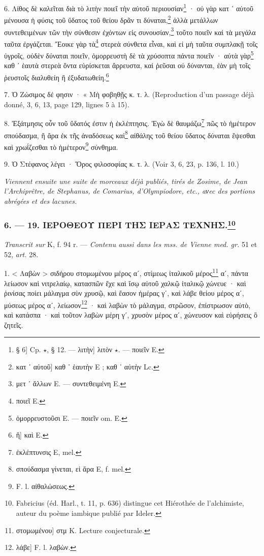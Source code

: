 \documentclass[a4paper, 11pt, oneside, polutonikogreek, french]{article}
\begin{document}
6. Λίθος δὲ καλεῖται διὰ τὸ λιτὴν ποιεῖ τὴν αὐτοῦ περιουσίαν\footnote{§ 6] Cp. $\star$, § 12. --- λιτὴν] λιτὸν $\star$. --- ποιεῖν E.} · οὐ γὰρ κατ ᾽ αὐτοῦ μένουσα ἡ φύσις τοῦ ὕδατος τοῦ θείου δρᾶν τι δύναται,\footnote{κατ ᾽ αὐτοῦ] καθ ᾽ ἑαυτὴν E ; καθ ᾽ αὑτὴν Lc.} ἀλλὰ μετάλλων συντεθειμένων τῶν τὴν σύνθεσιν ἐχόντων εἰς συνουσίαν,\footnote{μετ ᾽ ἄλλων E. --- συντεθειμένη E.} τοῦτο ποιεῖν καὶ τὰ μεγάλα ταῦτα ἐργάζεται. Ἔοικε γὰρ τὰ\footnote{ποιεῖ E.} στερεὰ σύνθετα εἶναι, καὶ εἰ μὴ ταῦτα συμπλακῇ τοῖς ὑγροῖς, οὐδὲν δύναται ποιεῖν, ὁμορρευστὴ δὲ τὰ χρύσοπτα πάντα ποιεῖν · αὐτὰ γὰρ\footnote{ὁμορρευστοῦσι E. --- ποιεῖν om. E.} καθ ᾽ ἑαυτὰ στερεὰ ὄντα εὑρίσκεται ἄρρευστα, καὶ ῥεῦσαι οὐ δύνανται, ἐὰν μὴ τοῖς ῥευστοῖς διαλυθείη ἢ ἐξυδατωθείη.\footnote{ἢ] καὶ E.}

7. Ὁ Ζώσιμος δέ φησιν · « Μὴ φοβηθῇς κ. τ. λ. (Reproduction d'un passage déjà donné, 3, 6, 13, page 129, lignes 5 à 15).

8. Ἐξάτμησις οὖν τοῦ ὕδατός ἐστιν ἡ ἐκλέπτησις. Ἐγὼ δὲ θαυμάζω\footnote{ἐκλέπτυνσις E, mel.} πῶς τὸ ἡμέτερον σπούδασμα, ἢ ἄρα ἐκ τῆς ἀναδόσεως καὶ\footnote{σπούδασμα γίνεται, εἰ ἄρα E, f. mel.} αἰθάλης τοῦ θείου ὕδατος δύναται ἕψεσθαι καὶ χρωΐζεσθαι τὸ ἡμέτερον\footnote{F. l. αἰθαλώσεως.} σύνθημα.

9. Ὁ Στέφανος λέγει · Ὅρος φιλοσοφίας κ. τ. λ. (Voir 3, 6, 23, p. 136, l. 10.)

\emph{Viennent ensuite une suite de morceaux déjà publiés, tirés de Zosime, de Jean l'Archiprêtre, de Stephanus, de Comarius, d'Olympiodore, etc., aνec des portions abrégées et des lacunes.}

\bigskip
\centerline{\EightStarTaper}
\centerline{\EightStarTaper\EightStarTaper}
\bigskip

\subsubsection[6. --- 19. ΙΕΡΟΘΕΟΥ ΠΕΡΙ ΤΗΣ ΙΕΡΑΣ ΤΕΧΝΗΣ.]{6. --- 19. ΙΕΡΟΘΕΟΥ ΠΕΡΙ ΤΗΣ ΙΕΡΑΣ ΤΕΧΝΗΣ.\footnote{Fabricius (éd. Harl., t. 11, p. 636) distingue cet Hiérothée de l'alchimiste, auteur du poème iambique publié par Ideler.}}

\emph{Transcrit sur} K, f. 94 r. --- \emph{Contenu aussi dans les mss. de Vienne med. gr.} 51 et 52, \emph{art.} 28.

1. < Λαβὼν > σιδήρου στομωμένου μέρος αʹ, στίμεως ἰταλικοῦ μέρος\footnote{στομωμένου] στμ K. Lecture conjecturale.} αʹ, πάντα λείωσον καὶ νιτρελαίῳ, κατασπῶν ἔχε καὶ ἴσῳ αὐτοῦ χαλκῷ ἰταλικῷ χώνευε · καὶ ῥινίσας ποίει μάλαγμα σὺν χρυσῷ, καὶ ἔασον ἡμέρας γʹ, καὶ λάβε θείου μέρος αʹ, μύσεως μέρος αʹ, λείωσον\footnote{λάβε] F. l. λαβὼν.} · καὶ λαβὼν τὸ μάλαγμα, στρῶσον, ἐπίστρωσον αὐτὸ, καὶ κατάσπα · καὶ τοῦτον λαβὼν μέρη γʹ, χρυσὸν μέρος αʹ, χώνευσον καὶ εὑρήσεις ὃ ζητεῖς.
\end{document}

